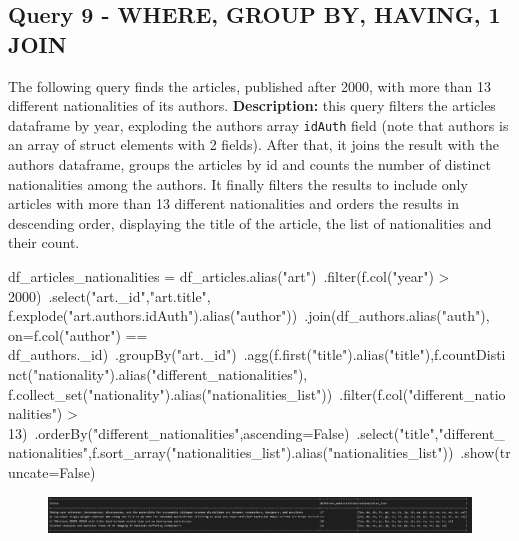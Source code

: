 \documentclass{Configuration_Files/PoliMi3i_thesis}
\begin{document}
\subsection{Query 9 - WHERE, GROUP BY, HAVING, 1 JOIN}
The following query finds the articles, published after 2000, with more than 13 different nationalities of its authors.\newline
\textbf{Description:} this query filters the articles dataframe by year, exploding the authors array \verb|idAuth| field (note that
authors is an array of struct elements with 2 fields). After that, it joins the result with the authors dataframe, groups the
articles by id and counts the number of distinct nationalities among the authors. It finally filters the results to include only
articles with more than 13 different nationalities and orders the results in descending order, displaying the title of the article,
the list of nationalities and their count.\newline
\begin{python}
df_articles_nationalities = df_articles.alias("art")\
                                .filter(f.col("year") > 2000)\
                                .select("art._id","art.title", f.explode("art.authors.idAuth").alias("author"))\
                                .join(df_authors.alias("auth"), on=f.col("author") == df_authors._id)\
                                .groupBy("art._id")\
                                .agg(f.first("title").alias("title"),f.countDistinct("nationality").alias("different_nationalities"), f.collect_set("nationality").alias("nationalities_list"))\
                                .filter(f.col("different_nationalities") > 13)\
                                .orderBy("different_nationalities",ascending=False)\
                                .select("title","different_nationalities",f.sort_array("nationalities_list").alias("nationalities_list"))\
                                .show(truncate=False)
\end{python}
\begin{figure}[H]
\centering
\includegraphics[width=1\textwidth]{query/spark_q9.PNG}
\label{fig:query9}
\end{figure}
\end{document}
